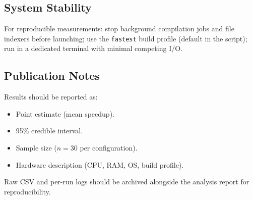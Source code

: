 \subsection{System Stability}

For reproducible measurements: stop background compilation jobs and file
indexers before launching; use the \texttt{fastest} build profile (default
in the script); run in a dedicated terminal with minimal competing I/O.

\subsection{Publication Notes}

Results should be reported as:

\begin{itemize}
  \item Point estimate (mean speedup).
  \item 95\% credible interval.
  \item Sample size ($n = 30$ per configuration).
  \item Hardware description (CPU, RAM, OS, build profile).
\end{itemize}

Raw CSV and per-run logs should be archived alongside the analysis report
for reproducibility.

